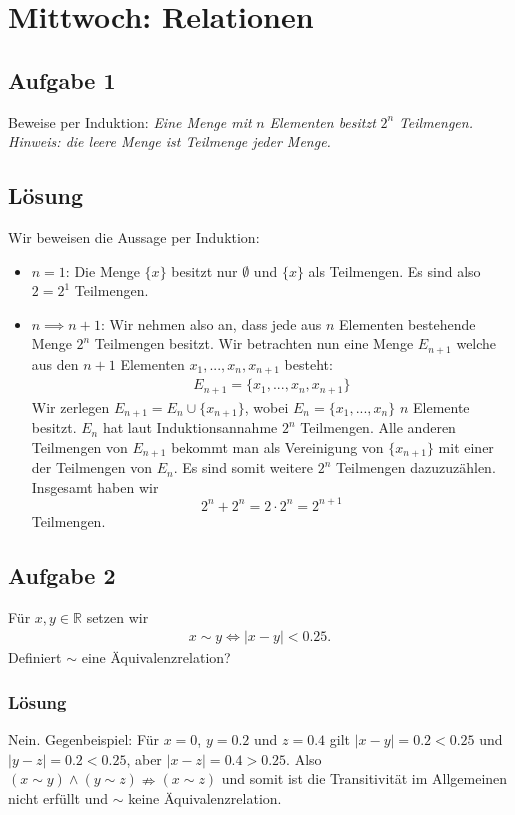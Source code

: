\documentclass[a4paper,10pt]{article}
\newcommand{\R}{\mathbb{R}}
\newcommand{\s}[1]{#1}
\begin{document}
\section*{Mittwoch: Relationen}
\subsection*{Aufgabe 1}
Beweise per Induktion: \textit{Eine Menge mit }$n$\textit{ Elementen besitzt} $2^n$ \textit{Teilmengen.}\\
\textit{Hinweis: die leere Menge ist Teilmenge jeder Menge.}
\s{\subsection*{Lösung}
Wir beweisen die Aussage per Induktion:
\begin{itemize}
    \item $n=1$: Die Menge $\{x\}$ besitzt nur $\emptyset$ und $\{x\}$ als Teilmengen. Es sind also $2=2^1$ Teilmengen.
    \item $n\implies n+1$: Wir nehmen also an, dass jede aus $n$ Elementen bestehende Menge $2^n$ Teilmengen besitzt. Wir betrachten nun eine Menge $E_{n+1}$ welche aus den $n+1$ Elementen $x_1,...,x_n,x_{n+1}$ besteht:
    \begin{align*}
        E_{n+1} = \{x_1,...,x_n,x_{n+1}\}
    \end{align*}
    Wir zerlegen $E_{n+1}=E_n\cup \{x_{n+1}\}$, wobei $E_n=\{x_1,...,x_n\}$ $n$ Elemente besitzt. $E_n$ hat laut Induktionsannahme $2^n$ Teilmengen. Alle anderen Teilmengen von $E_{n+1}$ bekommt man als Vereinigung von $\{x_{n+1}\}$ mit einer der Teilmengen von $E_n$. Es sind somit weitere $2^n$ Teilmengen dazuzuzählen. Insgesamt haben wir $$2^n+2^n=2\cdot 2^n=2^{n+1}$$Teilmengen.
\end{itemize}
}
\subsection*{Aufgabe 2}

Für $x,y\in \R$ setzen wir
\begin{align*}
    x\sim y \iff |x-y|<0.25.
\end{align*}
Definiert $\sim$ eine Äquivalenzrelation?

\s{\subsubsection*{Lösung}
	Nein. Gegenbeispiel: Für $x=0$, $y=0.2$ und $z=0.4$ gilt $|x-y|=0.2<0.25$ und $|y-z|=0.2<0.25$, aber $|x-z|=0.4>0.25$. Also $(x\sim y)\land(y\sim z)\nRightarrow (x\sim z)$ und somit ist die Transitivität im Allgemeinen nicht erfüllt und $\sim$ keine Äquivalenzrelation.
}
\end{document}
